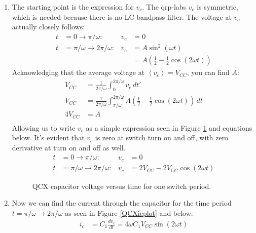 \documentclass[10pt,letterpaper]{article}
\begin{document}
\begin{enumerate}
\item The starting point is the expression for $v_c$. The qrp-labs $v_c$ is symmetric, which is needed because there is no LC bandpass filter. The voltage at $v_c$ actually closely follows:
\begin{align*}
t&=0\rightarrow \pi/\omega: &v_c &= 0\\
t&=\pi/\omega\rightarrow2\pi/\omega: &v_c &= A\sin^2(\omega t)\\
& & &=A\left(\frac{1}{2}-\frac{1}{2}\cos(2\omega t)\right)
\end{align*}
Acknowledging that the average voltage at $\left\langle v_c \right\rangle = V_{CC}$, you can find $A$:
\begin{align*}
V_{CC}&=\frac{1}{2\pi/\omega}\int_0^{2\pi/\omega}v_c\,dt'\\
V_{CC}&=\frac{1}{2\pi/\omega}\int_{\pi/\omega}^{2\pi/\omega}A\left(\frac{1}{2}-\frac{1}{2}\cos(2\omega t)\right)\,dt\\
4V_{CC}&=A\\
\end{align*}
Allowing us to write $v_c$ as a simple expression seen in Figure \ref{QCXvcplot} and equations below. It's evident that $v_c$ is zero at switch turn on and off, with zero derivative at turn on and off as well.
\begin{align*}
t&=0\rightarrow \pi/\omega: &v_c &= 0\\
t&=\pi/\omega\rightarrow2\pi/\omega: &v_c &= 2V_{CC}-2V_{CC}\cos(2\omega t)
\end{align*}
\begin{figure}
\centering
{}
\caption{QCX capacitor voltage versus time for one switch period.}
\label{QCXvcplot}
\end{figure}


\item Now we can find the current through the capacitor for the time period $t=\pi/\omega\rightarrow2\pi/\omega$ as seen in Figure \ref{QCXicplot} and below:
\begin{align*}
i_c &= C_1 \frac{d v_c}{dt}=4 \omega C_1 V_{CC}  \sin(2\omega t)\\
\end{align*}


\end{enumerate}
\end{document}
